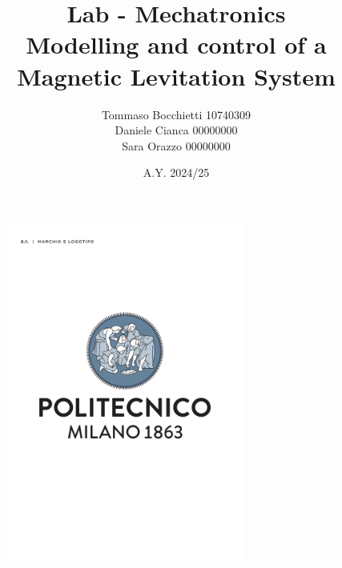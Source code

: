 \documentclass[draft=false]{assignment}
\begin{document}
\title{Lab - Mechatronics \\ Modelling and control of a Magnetic Levitation System}
\author{Tommaso Bocchietti 10740309 \\ Daniele Cianca 00000000 \\ Sara Orazzo 00000000}
\date{A.Y. 2024/25}

\maketitle

\begin{figure}[H]
    \centering
    \includegraphics[width=0.7\textwidth]{./pdf/Polimi_logo_coverpage.pdf}
    \label{fig:Polimi_logo}
\end{figure}

\clearpage
\tableofcontents
\listoffigures
\listoftables
\lstlistoflistings

\clearpage


\clearpage


\clearpage


\clearpage


\clearpage


\clearpage



% 
\end{document}
